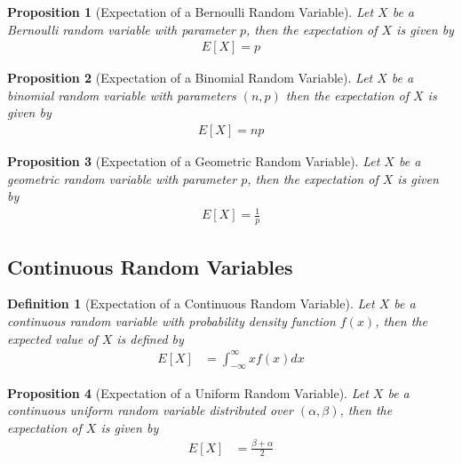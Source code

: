 \documentclass[11pt, oneside]{book}   	%
\newtheorem{definition}{Definition}[chapter]
\newtheorem{proposition}{Proposition}[chapter]
\begin{document}
\begin{spacing}{1.618}
\begin{proposition}[Expectation of a Bernoulli Random Variable]
	Let $X$ be a Bernoulli random variable with parameter $p$, then the expectation of $X$ is given by
	\begin{alignat}{4}
		E[X]=p
	\end{alignat}
\end{proposition}

\begin{proposition}[Expectation of a Binomial Random Variable]
	Let $X$ be a binomial random variable with parameters $(n, p)$ then the expectation of $X$ is given by 
	\begin{alignat}{4}
		E[X]=np
	\end{alignat}
\end{proposition}

\begin{proposition}[Expectation of a Geometric Random Variable]
	Let $X$ be a geometric random variable with parameter $p$, then the expectation of $X$ is given by 
	\begin{alignat}{4}
		E[X]=\frac{1}{p}
	\end{alignat}
\end{proposition}

\subsection{Continuous Random Variables}
\begin{definition}[Expectation of a Continuous Random Variable]
	Let $X$ be a continuous random variable with probability density function $f(x)$, then the \emph{expected value} of $X$ is defined by
	\begin{alignat}{4}
		E[X]&=\int_{-\infty}^\infty xf(x)dx
	\end{alignat}
\end{definition}

\begin{proposition}[Expectation of a Uniform Random Variable]
	Let $X$ be a continuous uniform random variable distributed over $(\alpha, \beta)$, then the expectation of $X$ is given by 
	\begin{alignat}{4}
		E[X]&=\frac{\beta+\alpha}{2}
	\end{alignat}
\end{proposition}


\end{spacing}
\end{document}
